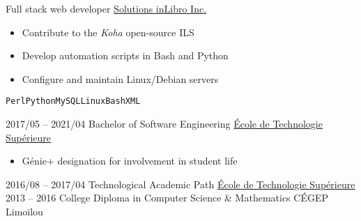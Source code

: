 \documentclass[9pt]{developercv} %
\begin{document}
\begin{minipage}[t]{0.8\textwidth}
\begin{entrylist}
		{Full stack web developer}
		{\href{https://inlibro.com/en/}{Solutions inLibro Inc.}}
		{
			\vspace{-14pt}
			\begin{itemize}
				\renewcommand{\labelitemi}{\raisebox{.45ex}{\rule{.6ex}{.6ex}}}
				\setlength\itemsep{-1pt}
				\item Contribute to the \emph{Koha} open-source ILS
				\item Develop automation scripts in Bash and Python
				\item Configure and maintain Linux/Debian servers
			\end{itemize}
			\vspace{-4pt}
			\texttt{Perl}\slashsep\texttt{Python}\slashsep\texttt{MySQL}\slashsep\texttt{Linux}\slashsep\texttt{Bash}\slashsep\texttt{XML}
		}
\end{entrylist}



\begin{entrylist}
	\setlength\itemsep{-1pt}
	\entry
		{2017/05 -- 2021/04}
		{Bachelor of Software Engineering}
		{\href{https://etsmtl.ca}{École de Technologie Supérieure}}
		{
			\vspace{-14pt}
			\begin{itemize}
				\renewcommand{\labelitemi}{\raisebox{.45ex}{\rule{.6ex}{.6ex}}}
				\setlength\itemsep{-1pt}
				\item Génie+ designation for involvement in student life
			\end{itemize}
			\vspace{-8pt}
		}
	\entry
		{2016/08 -- 2017/04}
		{Technological Academic Path}
		{\href{https://etsmtl.ca}{École de Technologie Supérieure}}
		{\vspace{-14pt}}
	\entry
		{2013 -- 2016}
		{College Diploma in Computer Science \& Mathematics}
		{CÉGEP Limoilou}
		{\vspace{-14pt}}
\end{entrylist}




\end{minipage}
\end{document}
